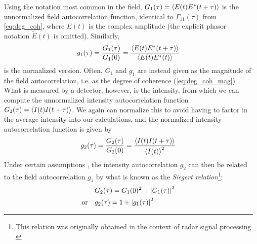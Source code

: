 Using the notation most common in the field, $G_1(\tau) = \expval{E(t)E^*(t+\tau)}$ is the unnormalized field autocorrelation function, identical to $\Gamma_{11}(\tau)$ from \autoref{eq:deg_coh}, where $E(t)$ is the complex amplitude (the explicit phasor notation $\tilde{E}(t)$ is omitted). Similarly, 
\begin{equation} \label{eq:g1_def}
g_1(\tau) = \frac{G_1(\tau)}{G_1(0)} = \frac{\expval{E(t)E^*(t+\tau)}}{\expval{E(t)E^*(t)}}
\end{equation}
is the normalized version. Often, $G_1$ and $g_1$ are instead given as the magnitude of the field autocorrelation, i.e. as the degree of coherence (\autoref{eq:deg_coh_mag}) What is measured by a detector, however, is the intensity, from which we can compute the unnormalized intensity autocorrelation function $G_2(\tau) = \expval{I(t)I(t+\tau)}$. We again can normalize this to avoid having to factor in the average intensity into our calculations, and the normalized intensity autocorrelation function is given by 
\begin{equation} \label{eq:g2_def}
g_2(\tau) = \frac{G_2(\tau)}{G_2(0)} = \frac{\expval{I(t)I(t+\tau)}}{\expval{I(t)}^2}
\end{equation}
Under certain assumptions \cite[ch. 2.3.3.1]{Brown1993}, the intensity autocorrelation $g_2$ can then be related to the field autocorrelation $g_1$ by what is known as the \emph{Siegert relation}\footnote{This relation was originally obtained in the context of radar signal processing \cite{Siegert1943}}:
\begin{align}
                   &G_2(\tau) = G_1(0)^2 + \abs{G_1(\tau)}^2\\
\textnormal{or~~~} &g_2(\tau) = 1+\abs{g_1(\tau)}^2 \label{eq:siegert_no_beta}
\end{align}  

